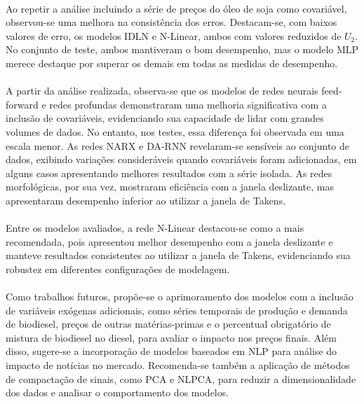 \paragraph{} Ao repetir a análise incluindo a série de preços do óleo de soja como covariável, observou-se uma melhora na consistência dos erros. Destacam-se, com baixos valores de erro, os modelos \ac{IDLN} e \ac{N-Linear}, ambos com valores reduzidos de \(U_2\). No conjunto de teste, ambos mantiveram o bom desempenho, mas o modelo \ac{MLP} merece destaque por superar os demais em todas as medidas de desempenho.

\paragraph{} A partir da análise realizada, observa-se que os modelos de redes neurais feed-forward e redes profundas demonstraram uma melhoria significativa com a inclusão de covariáveis, evidenciando sua capacidade de lidar com grandes volumes de dados. No entanto, nos testes, essa diferença foi observada em uma escala menor. As redes \ac{NARX} e \ac{DA-RNN} revelaram-se sensíveis ao conjunto de dados, exibindo variações consideráveis quando covariáveis foram adicionadas, em alguns casos apresentando melhores resultados com a série isolada. As redes morfológicas, por sua vez, mostraram eficiência com a janela deslizante, mas apresentaram desempenho inferior ao utilizar a janela de Takens.

\paragraph{} Entre os modelos avaliados, a rede \ac{N-Linear} destacou-se como a mais recomendada, pois apresentou melhor desempenho com a janela deslizante e manteve resultados consistentes ao utilizar a janela de Takens, evidenciando sua robustez em diferentes configurações de modelagem.

\paragraph{} Como trabalhos futuros, propõe-se o aprimoramento dos modelos com a inclusão de variáveis exógenas adicionais, como séries temporais de produção e demanda de biodiesel, preços de outras matérias-primas e o percentual obrigatório de mistura de biodiesel no diesel, para avaliar o impacto nos preços finais. Além disso, sugere-se a incorporação de modelos baseados em \ac{NLP} para análise do impacto de notícias no mercado. Recomenda-se também a aplicação de métodos de compactação de sinais, como \ac{PCA} e \ac{NLPCA}, para reduzir a dimensionalidade dos dados e analisar o comportamento dos modelos.

